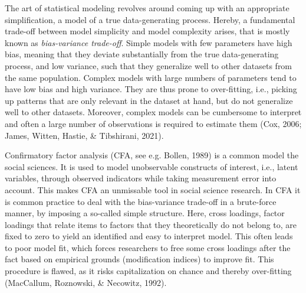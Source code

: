 \documentclass[
  man, donotrepeattitle,floatsintext]{apa6}
\begin{document}
The art of statistical modeling revolves around coming up with an
appropriate simplification, a model of a true data-generating process.
Hereby, a fundamental trade-off between model simplicity and model
complexity arises, that is mostly known as \emph{bias-variance trade-off}.
Simple models with few parameters have high bias, meaning that they
deviate substantially from the true data-generating process, and low
variance, such that they generalize well to other datasets from the same
population. Complex models with large numbers of parameters tend to have
low bias and high variance. They are thus prone to over-fitting, i.e.,
picking up patterns that are only relevant in the dataset at hand, but
do not generalize well to other datasets. Moreover, complex models can
be cumbersome to interpret and often a large number of observations is
required to estimate them (Cox, 2006; James, Witten, Hastie, \& Tibshirani, 2021).

Confirmatory factor analysis (CFA, see e.g. Bollen, 1989) is
a common model the social sciences. It is used to model unobservable
constructs of interest, i.e., latent variables, through observed
indicators while taking measurement error into account. This makes CFA
an unmissable tool in social science research. In CFA it is common
practice to deal with the bias-variance trade-off in a brute-force
manner, by imposing a so-called simple structure. Here, cross loadings,
factor loadings that relate items to factors that they theoretically do
not belong to, are fixed to zero to yield an identified and easy to
interpret model. This often leads to poor model fit, which forces
researchers to free some cross loadings after the fact based on
empirical grounds (modification indices) to improve fit. This procedure
is flawed, as it risks capitalization on chance and thereby over-fitting
(MacCallum, Roznowski, \& Necowitz, 1992).
\end{document}
